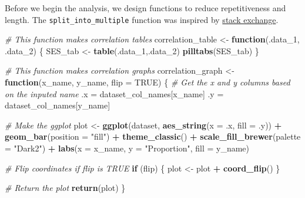 \documentclass[
  twocolumn]{article}
\newenvironment{Shaded}{\begin{snugshade}}{\end{snugshade}}
\newcommand{\AttributeTok}[1]{\textcolor[rgb]{0.13,0.29,0.53}{#1}}
\newcommand{\CommentTok}[1]{\textcolor[rgb]{0.56,0.35,0.01}{\textit{#1}}}
\newcommand{\ConstantTok}[1]{\textcolor[rgb]{0.56,0.35,0.01}{#1}}
\newcommand{\ControlFlowTok}[1]{\textcolor[rgb]{0.13,0.29,0.53}{\textbf{#1}}}
\newcommand{\FunctionTok}[1]{\textcolor[rgb]{0.13,0.29,0.53}{\textbf{#1}}}
\newcommand{\NormalTok}[1]{#1}
\newcommand{\OtherTok}[1]{\textcolor[rgb]{0.56,0.35,0.01}{#1}}
\newcommand{\SpecialCharTok}[1]{\textcolor[rgb]{0.81,0.36,0.00}{\textbf{#1}}}
\newcommand{\StringTok}[1]{\textcolor[rgb]{0.31,0.60,0.02}{#1}}
\begin{document}
Before we begin the analysis, we design functions to reduce
repetitiveness and length. The \texttt{split\_into\_multiple} function
was inspired by
\href{https://stackoverflow.com/questions/4350440/split-data-frame-string-column-into-multiple-columns}{stack
exchange}.

\begin{Shaded}
\begin{Highlighting}[]
\CommentTok{\# This function makes correlation tables}
\NormalTok{correlation\_table }\OtherTok{\textless{}{-}} \ControlFlowTok{function}\NormalTok{(.data\_1, .data\_2) \{}
\NormalTok{  SES\_tab }\OtherTok{\textless{}{-}} \FunctionTok{table}\NormalTok{(.data\_1,.data\_2)}
  \FunctionTok{pilltabs}\NormalTok{(SES\_tab)}
\NormalTok{\}}
 
\CommentTok{\# This function makes correlation graphs}
\NormalTok{correlation\_graph }\OtherTok{\textless{}{-}} \ControlFlowTok{function}\NormalTok{(x\_name, y\_name, }\AttributeTok{flip =} \ConstantTok{TRUE}\NormalTok{) \{}
  \CommentTok{\# Get the x and y columns based on the inputed name}
\NormalTok{  .x }\OtherTok{=}\NormalTok{ dataset\_col\_names[x\_name]}
\NormalTok{  .y }\OtherTok{=}\NormalTok{ dataset\_col\_names[y\_name]}
    
  \CommentTok{\# Make the ggplot}
\NormalTok{  plot }\OtherTok{\textless{}{-}} \FunctionTok{ggplot}\NormalTok{(dataset, }\FunctionTok{aes\_string}\NormalTok{(}\AttributeTok{x =}\NormalTok{ .x,}
                    \AttributeTok{fill =}\NormalTok{ .y)) }\SpecialCharTok{+}
  \FunctionTok{geom\_bar}\NormalTok{(}\AttributeTok{position =} \StringTok{"fill"}\NormalTok{) }\SpecialCharTok{+}
  \FunctionTok{theme\_classic}\NormalTok{() }\SpecialCharTok{+}
  \FunctionTok{scale\_fill\_brewer}\NormalTok{(}\AttributeTok{palette =} \StringTok{"Dark2"}\NormalTok{) }\SpecialCharTok{+}
  \FunctionTok{labs}\NormalTok{(}\AttributeTok{x =}\NormalTok{ x\_name,}
       \AttributeTok{y =} \StringTok{"Proportion"}\NormalTok{,}
       \AttributeTok{fill =}\NormalTok{ y\_name)}
  
  \CommentTok{\# Flip coordinates if flip is TRUE}
  \ControlFlowTok{if}\NormalTok{ (flip) \{}
\NormalTok{    plot }\OtherTok{\textless{}{-}}\NormalTok{ plot }\SpecialCharTok{+} \FunctionTok{coord\_flip}\NormalTok{()}
\NormalTok{  \}}
  
  \CommentTok{\# Return the plot}
  \FunctionTok{return}\NormalTok{(plot)}
\NormalTok{\}}
\end{Highlighting}
\end{Shaded}
\end{document}
